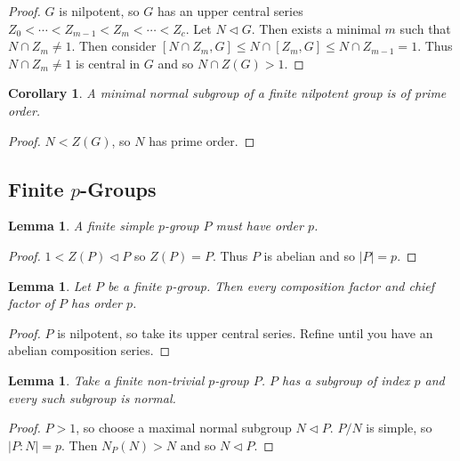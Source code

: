 \documentclass[a4paper,10pt]{article}
\newtheorem{Cor}[thm]{Corollary}
\newtheorem{Lem}[thm]{Lemma}
\begin{document}
\begin{proof}
$G$ is nilpotent, so $G$ has an upper central series $Z_0 < \cdots < Z_{m-1} < Z_m < \cdots < Z_c$. Let $N \triangleleft G$. Then exists a minimal $m$ such that $N \cap Z_m \neq 1$. Then consider $[N \cap Z_m, G] \leq N \cap [Z_m, G] \leq N \cap Z_{m-1} = 1$. Thus $N \cap Z_m \neq 1$ is central in $G$ and so $N \cap Z(G) > 1$.  
\end{proof}

\begin{Cor}
A minimal normal subgroup of a finite nilpotent group is of prime order. 
\end{Cor}

\begin{proof}
$N < Z(G)$,  so $N$ has prime order.
\end{proof}



\subsection{Finite $p$-Groups}

\begin{Lem}
A finite simple $p$-group $P$ must have order $p$.
\end{Lem}

\begin{proof}
$1 < Z(P) \triangleleft P$ so $Z(P) = P$. Thus $P$ is abelian and so $|P| = p$.
\end{proof}

\begin{Lem}
Let $P$ be a finite $p$-group. Then every composition factor and chief factor of $P$ has order $p$. 
\end{Lem}

\begin{proof}
$P$ is nilpotent, so take its upper central series. Refine until you have an abelian composition series. 
\end{proof}

\begin{Lem}
Take a finite non-trivial $p$-group $P$. $P$ has a subgroup of index $p$ and every such subgroup is normal.
\end{Lem}

\begin{proof}
$P > 1$, so choose a maximal normal subgroup $N \triangleleft P$. $P / N$ is simple, so $|P : N| = p$. Then $N_P(N) > N$ and so $N \triangleleft P$. 
\end{proof}
\end{document}
